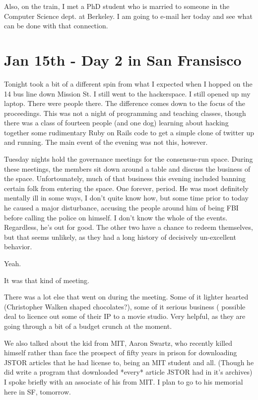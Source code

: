 \documentclass[11pt]{amsart}
\begin{document}
Also, on the train, I met a PhD student who is married to someone in the Computer Science dept. at  Berkeley. I am going to e-mail her today and see what can be done with that connection.

\section{Jan 15th - Day 2 in San Fransisco}

Tonight took a bit of a different spin from what I expected when I hopped on the 14 bus line down Mission St. I still went to the hackerspace. I still opened up my laptop. There were people there. The difference comes down to the focus of the proceedings. This was not a night of programming and teaching classes, though there was a class of fourteen people (and one dog) learning about hacking together some rudimentary Ruby on Rails code to get a simple clone of twitter up and running. The main event of the evening was not this, however.

Tuesday nights hold the governance meetings for the consensus-run space. During these meetings, the members sit down around a table and discuss the business of the space. Unfortounately, much of that business this evening included banning certain folk from entering the space. One forever, period. He was most definitely mentally ill in some ways, I don't quite know how, but some time prior to today he caused a major disturbance, accusing the people around him of being FBI before calling the police on himself. I don't know the whole of the events. Regardless, he's out for good. The other two have a chance to redeem themselves, but that seems unlikely, as they had a long history of decisively un-excellent behavior.

Yeah.

It was that kind of meeting.

There was a lot else that went on during the meeting. Some of it lighter hearted (Christopher Walken shaped chocolates?), some of it serious business ( possible deal to licence out some of their IP to a movie studio. Very helpful, as they are going through a bit of a budget crunch at the moment.

We also talked about the kid from MIT, Aaron Swartz, who recently killed himself rather than face the prospect of fifty years in prison for downloading JSTOR articles that he had license to, being an MIT student and all. (Though he did write a program that downloaded *every* article JSTOR had in it's archives) I spoke briefly with an associate of his from MIT. I plan to go to his memorial here in SF, tomorrow.
\end{document}
